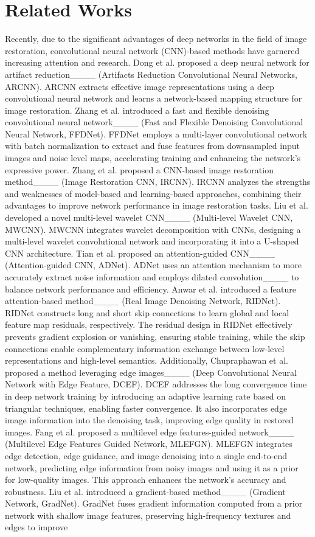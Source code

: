 \section{Related Works}
Recently, due to the significant advantages of deep networks in the field of image restoration, convolutional neural network (CNN)-based methods have garnered increasing attention and research. Dong et al. proposed a deep neural network for artifact reduction____ (Artifacts Reduction Convolutional Neural Networks, ARCNN). ARCNN extracts effective image representations using a deep convolutional neural network and learns a network-based mapping structure for image restoration. Zhang et al. introduced a fast and flexible denoising convolutional neural network____ (Fast and Flexible Denoising Convolutional Neural Network, FFDNet). FFDNet employs a multi-layer convolutional network with batch normalization to extract and fuse features from downsampled input images and noise level maps, accelerating training and enhancing the network's expressive power. Zhang et al. proposed a CNN-based image restoration method____ (Image Restoration CNN, IRCNN). IRCNN analyzes the strengths and weaknesses of model-based and learning-based approaches, combining their advantages to improve network performance in image restoration tasks. Liu et al. developed a novel multi-level wavelet CNN____ (Multi-level Wavelet CNN, MWCNN). MWCNN integrates wavelet decomposition with CNNs, designing a multi-level wavelet convolutional network and incorporating it into a U-shaped CNN architecture. Tian et al. proposed an attention-guided CNN____ (Attention-guided CNN, ADNet). ADNet uses an attention mechanism to more accurately extract noise information and employs dilated convolution____ to balance network performance and efficiency. Anwar et al. introduced a feature attention-based method____ (Real Image Denoising Network, RIDNet). RIDNet constructs long and short skip connections to learn global and local feature map residuals, respectively. The residual design in RIDNet effectively prevents gradient explosion or vanishing, ensuring stable training, while the skip connections enable complementary information exchange between low-level representations and high-level semantics. Additionally, Chupraphawan et al. proposed a method leveraging edge images____ (Deep Convolutional Neural Network with Edge Feature, DCEF). DCEF addresses the long convergence time in deep network training by introducing an adaptive learning rate based on triangular techniques, enabling faster convergence. It also incorporates edge image information into the denoising task, improving edge quality in restored images. Fang et al. proposed a multilevel edge features-guided network____ (Multilevel Edge Features Guided Network, MLEFGN). MLEFGN integrates edge detection, edge guidance, and image denoising into a single end-to-end network, predicting edge information from noisy images and using it as a prior for low-quality images. This approach enhances the network's accuracy and robustness. Liu et al. introduced a gradient-based method____ (Gradient Network, GradNet). GradNet fuses gradient information computed from a prior network with shallow image features, preserving high-frequency textures and edges to improve 